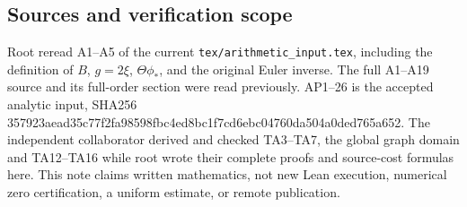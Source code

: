 \subsection{Sources and verification scope}\label{sources-and-verification-scope}

Root reread A1--A5 of the current \texttt{tex/arithmetic\_input.tex}, including the
definition of \(B\), \(g=2\xi\), \(\Theta\phi_*\), and the original Euler inverse. The full
A1--A19 source and its full-order section were read previously. AP1--26 is the
accepted analytic input, SHA256
357923aead35c77f2fa98598fbc4ed8bc1f7cd6ebc04760da504a0ded765a652.
The independent collaborator derived and checked TA3--TA7, the global graph
domain and TA12--TA16 while root wrote their complete proofs and source-cost
formulas here. This note claims written mathematics, not new Lean execution,
numerical zero certification, a uniform estimate, or remote publication.
